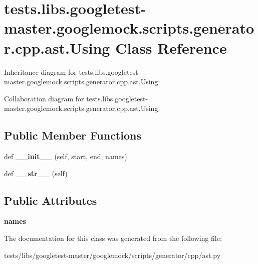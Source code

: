 \hypertarget{classtests_1_1libs_1_1googletest-master_1_1googlemock_1_1scripts_1_1generator_1_1cpp_1_1ast_1_1Using}{}\section{tests.\+libs.\+googletest-\/master.googlemock.\+scripts.\+generator.\+cpp.\+ast.\+Using Class Reference}
\label{classtests_1_1libs_1_1googletest-master_1_1googlemock_1_1scripts_1_1generator_1_1cpp_1_1ast_1_1Using}


Inheritance diagram for tests.\+libs.\+googletest-\/master.googlemock.\+scripts.\+generator.\+cpp.\+ast.\+Using\+:


Collaboration diagram for tests.\+libs.\+googletest-\/master.googlemock.\+scripts.\+generator.\+cpp.\+ast.\+Using\+:
\subsection*{Public Member Functions}
\begin{DoxyCompactItemize}
\item 
\mbox{\label{classtests_1_1libs_1_1googletest-master_1_1googlemock_1_1scripts_1_1generator_1_1cpp_1_1ast_1_1Using_a7c8df6ff0f7e1798c62da45c6e63c31e}} 
def {\bfseries \+\_\+\+\_\+init\+\_\+\+\_\+} (self, start, end, names)
\item 
\mbox{\label{classtests_1_1libs_1_1googletest-master_1_1googlemock_1_1scripts_1_1generator_1_1cpp_1_1ast_1_1Using_a6b94d2364e8410959ac768a8f48e1e94}} 
def {\bfseries \+\_\+\+\_\+str\+\_\+\+\_\+} (self)
\end{DoxyCompactItemize}
\subsection*{Public Attributes}
\begin{DoxyCompactItemize}
\item 
\mbox{\label{classtests_1_1libs_1_1googletest-master_1_1googlemock_1_1scripts_1_1generator_1_1cpp_1_1ast_1_1Using_aa19978aab132f05558f517483a7520e3}} 
{\bfseries names}
\end{DoxyCompactItemize}


The documentation for this class was generated from the following file\+:\begin{DoxyCompactItemize}
\item 
tests/libs/googletest-\/master/googlemock/scripts/generator/cpp/ast.\+py\end{DoxyCompactItemize}
